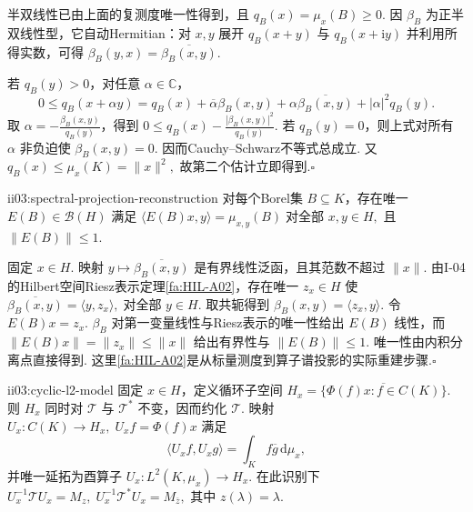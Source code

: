 \begin{FAProof}
半双线性已由上面的复测度唯一性得到，且 \(\displaystyle q_B(x)=\mu_x(B)\geqslant0\). 因 \(\displaystyle\beta_B\) 为正半双线性型，它自动Hermitian：对 \(\displaystyle x,y\) 展开 \(\displaystyle q_B(x+y)\) 与 \(\displaystyle q_B(x+\mathrm{i}y)\) 并利用所得实数，可得 \(\displaystyle\beta_B(y,x)=\overline{\beta_B(x,y)}\).

若 \(\displaystyle q_B(y)>0\)，对任意 \(\displaystyle\alpha\in\mathbb C\)，
\[
0\leqslant q_B(x+\alpha y)
=q_B(x)+\overline\alpha\beta_B(x,y)+\alpha\overline{\beta_B(x,y)}+|\alpha|^2q_B(y).
\]
取 \(\displaystyle\alpha=-\frac{\beta_B(x,y)}{q_B(y)}\)，得到
\(\displaystyle 0\leqslant q_B(x)-\frac{|\beta_B(x,y)|^2}{q_B(y)}.\)
若 \(\displaystyle q_B(y)=0\)，则上式对所有 \(\displaystyle\alpha\) 非负迫使 \(\displaystyle\beta_B(x,y)=0\). 因而Cauchy--Schwarz不等式总成立. 又
\(\displaystyle q_B(x)\leqslant\mu_x(K)=\|x\|^2,\)
故第二个估计立即得到.\hfill\(\square\)
\end{FAProof}

\begin{FAProposition}[B][谱投影算子的重建]{ii03:spectral-projection-reconstruction}
对每个Borel集 \(\displaystyle B\subseteq K\)，存在唯一 \(\displaystyle E(B)\in\mathcal B(H)\) 满足
\(\displaystyle \langle E(B)x,y\rangle=\mu_{x,y}(B) \;\text{对全部 }x,y\in H,\)
且 \(\displaystyle\|E(B)\|\leqslant1\).
\end{FAProposition}

\begin{FAProof}
固定 \(\displaystyle x\in H\). 映射
\(\displaystyle y\longmapsto\overline{\beta_B(x,y)}\)
是有界线性泛函，且其范数不超过 \(\displaystyle\|x\|\). 由I-04的Hilbert空间Riesz表示定理\autoref{fa:HIL-A02}，存在唯一 \(\displaystyle z_x\in H\) 使
\(\displaystyle \overline{\beta_B(x,y)}=\langle y,z_x\rangle ,\;\text{对全部 }y\in H.\)
取共轭得到 \(\displaystyle\beta_B(x,y)=\langle z_x,y\rangle\). 令 \(\displaystyle E(B)x=z_x\). \(\displaystyle\beta_B\) 对第一变量线性与Riesz表示的唯一性给出 \(\displaystyle E(B)\) 线性，而
\(\displaystyle \|E(B)x\|=\|z_x\|\leqslant\|x\|\)
给出有界性与 \(\displaystyle\|E(B)\|\leqslant1\). 唯一性由内积分离点直接得到. 这里\autoref{fa:HIL-A02}是从标量测度到算子谱投影的实际重建步骤.\hfill\(\square\)
\end{FAProof}

\begin{FAProposition}[B][循环 \(\displaystyle L^2\) 模型]{ii03:cyclic-l2-model}
固定 \(\displaystyle x\in H\)，定义循环子空间
\(\displaystyle H_x= \overline{\{\Phi(f)x:f\in C(K)\}}.\)
则 \(\displaystyle H_x\) 同时对 \(\displaystyle\mathcal T\) 与 \(\displaystyle\mathcal T^*\) 不变，因而约化 \(\displaystyle\mathcal T\). 映射
\(\displaystyle U_x:C(K)\longrightarrow H_x, \; U_xf=\Phi(f)x\)
满足
\[
\langle U_xf,U_xg\rangle
=\int_K f\overline g\,\mathrm{d}\mu_x,
\]
并唯一延拓为酉算子
\(\displaystyle U_x:L^2(K,\mu_x)\longrightarrow H_x.\)
在此识别下
\(\displaystyle U_x^{-1}\mathcal T U_x=M_z, \; U_x^{-1}\mathcal T^*U_x=M_{\overline z},\)
其中 \(\displaystyle z(\lambda)=\lambda\).
\end{FAProposition}


